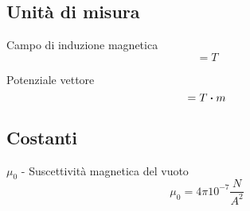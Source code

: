 \subsection{Unità di misura}
Campo di induzione magnetica
    \begin{equation} [B]  = T \label{}\end{equation}

Potenziale vettore
    \begin{equation} [A]  = T \vdot m \label{}\end{equation}


\subsection{Costanti}
$\mu_0$ - Suscettività magnetica del vuoto
    \begin{equation} \mu_0 = 4\pi 10^{-7} \frac{N}{A^2} \label{}\end{equation}
